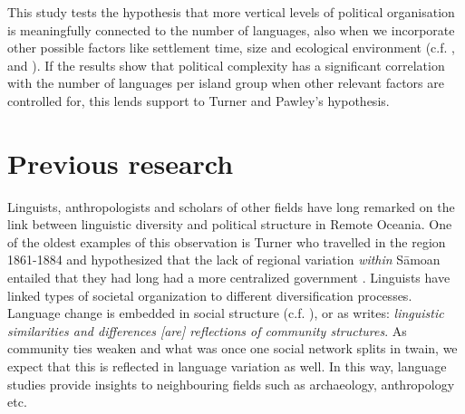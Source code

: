 \documentclass[a4paper,10pt]{article} %
\begin{document}

This study tests the hypothesis that more vertical levels of political organisation is meaningfully connected to the number of languages, also when we incorporate other possible factors like settlement time, size and ecological environment (c.f. \citet{NETTLE1998}, \citet{gavin2012island} and \citet{hua2019ecological}). If the results show that political complexity has a significant correlation with the number of languages per island group when other relevant factors are controlled for, this lends support to Turner and Pawley's hypothesis.
 


\FloatBarrier
\section{Previous research}
\label{sec:previous_research}
Linguists, anthropologists and scholars of other fields have long remarked on the link between linguistic diversity and political structure in Remote Oceania. One of the oldest examples of this observation is Turner who travelled in the region 1861-1884 and hypothesized that the lack of regional variation \emph{within} S\={a}moan entailed that they had long had a more centralized government \citep[172]{turner1884}. Linguists have linked types of societal organization to different diversification processes. Language change is embedded in social structure (c.f. \citep{WLH1968}), or as \citet[124]{grace_1992_aberrant} writes: \emph{linguistic similarities and differences [are] reflections of community structures}. As community ties weaken and what was once one social network splits in twain, we expect that this is reflected in language variation as well. In this way, language studies provide insights to neighbouring fields such as archaeology, anthropology etc.
\end{document}
